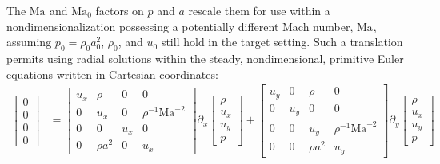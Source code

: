 \documentclass[letterpaper,11pt,nointlimits,reqno]{amsart}
\newcommand{\Mach}[1][]{\mbox{Ma}_{#1}}
\begin{document}
%
The $\Mach$ and $\Mach[0]{}$ factors on $p$ and $a$ rescale them for use within
a nondimensionalization possessing a potentially different Mach number, $\Mach$,
assuming $p_0 = \rho_0 a_0^2$, $\rho_0$, and $u_0$ still hold in the target
setting.  Such a translation permits using radial solutions within the steady,
nondimensional, primitive Euler equations written in Cartesian coordinates:
%
\begin{align}
  \begin{bmatrix} 0 \\ 0 \\ 0 \\ 0 \end{bmatrix}
&=
  \begin{bmatrix}
     u_x  &  \rho      &  0    &  0                    \\
     0    &  u_x       &  0    &  \rho^{-1}\Mach^{-2}  \\
     0    &  0         &  u_x  &  0                    \\
     0    &  \rho{}a^2 &  0    &  u_x
  \end{bmatrix}
  \partial_x
  \begin{bmatrix} \rho \\ u_x \\ u_y \\ p \end{bmatrix}
+
  \begin{bmatrix}
     u_y  &  0    &  \rho       &  0                    \\
     0    &  u_y  &  0          &  0                    \\
     0    &  0    &  u_y        &  \rho^{-1}\Mach^{-2}  \\
     0    &  0    &  \rho{}a^2  &  u_y
  \end{bmatrix}
  \partial_y
  \begin{bmatrix} \rho \\ u_x \\ u_y \\ p \end{bmatrix}
  \label{eq:cartEuler}
\end{align}
\end{document}
